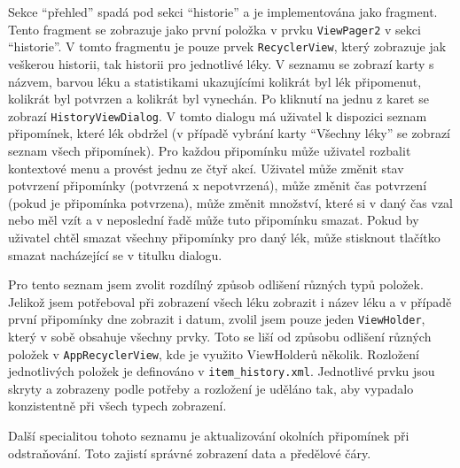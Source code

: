 \documentclass[../TakeYourPill.tex]{subfiles}
\begin{document}
Sekce \enquote{přehled} spadá pod sekci \enquote{historie} a je implementována jako fragment. Tento fragment se zobrazuje jako první položka v prvku \texttt{ViewPager2} v sekci \enquote{historie}. V tomto fragmentu je pouze prvek \texttt{RecyclerView}, který zobrazuje jak veškerou historii, tak historii pro jednotlivé léky. V seznamu se zobrazí karty s názvem, barvou léku a statistikami ukazujícími kolikrát byl lék připomenut, kolikrát byl potvrzen a kolikrát byl vynechán. Po kliknutí na jednu z karet se zobrazí \texttt{HistoryViewDialog}\label{sec:historydialog}. V tomto dialogu má uživatel k dispozici seznam připomínek, které lék obdržel (v případě vybrání karty \enquote{Všechny léky} se zobrazí seznam všech připomínek). Pro každou připomínku může uživatel rozbalit kontextové menu a provést jednu ze čtyř akcí. Uživatel může změnit stav potvrzení připomínky (potvrzená x nepotvrzená), může změnit čas potvrzení (pokud je připomínka potvrzena), může změnit množství, které si v daný čas vzal nebo měl vzít a v neposlední řadě může tuto připomínku smazat. Pokud by uživatel chtěl smazat všechny připomínky pro daný lék, může stisknout tlačítko smazat nacházející se v titulku dialogu.

Pro tento seznam jsem zvolit rozdílný způsob odlišení různých typů položek. Jelikož jsem potřeboval při zobrazení všech léku zobrazit i název léku a v případě první připomínky dne zobrazit i datum, zvolil jsem pouze jeden \texttt{ViewHolder}, který v sobě obsahuje všechny prvky. Toto se liší od způsobu odlišení různých položek v \texttt{AppRecyclerView}, kde je využito ViewHolderů několik. Rozložení jednotlivých položek je definováno v \texttt{item\_history.xml}. Jednotlivé prvku jsou skryty a zobrazeny podle potřeby a rozložení je uděláno tak, aby vypadalo konzistentně při všech typech zobrazení.

Další specialitou tohoto seznamu je aktualizování okolních připomínek při odstraňování. Toto zajistí správné zobrazení data a předělové čáry.
\end{document}
